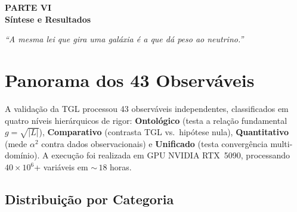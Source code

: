 \documentclass[12pt,a4paper,twoside]{article}
\newcommand{\alphaii}{\alpha^{2}}
\begin{document}
\setcounter{section}{0}
\renewcommand{\thesection}{VI.\arabic{section}}
\renewcommand{\theequation}{VI.\arabic{equation}}
\renewcommand{\theHsection}{VI.\arabic{section}} %
\setcounter{table}{0}
\renewcommand{\thetable}{VI.\arabic{table}}
\setcounter{footnote}{0}

\begin{center}
\vspace*{1cm}
{\huge\bfseries\color{tglblue} PARTE VI}\\[0.5cm]
{\LARGE\bfseries\color{tglblue} S\'intese e Resultados}\\[0.3cm]
\vspace*{1cm}
{\large\itshape ``A mesma lei que gira uma gal\'axia \'e a que d\'a peso ao neutrino.''}\\[0.2cm]
\vspace*{1.5cm}
\end{center}


\section{Panorama dos 43 Observ\'aveis}


A valida\c{c}\~ao da TGL processou 43 observ\'aveis independentes, classificados em quatro n\'iveis hier\'arquicos de rigor: \textbf{Ontol\'ogico} (testa a rela\c{c}\~ao fundamental $g = \sqrt{|L|}$), \textbf{Comparativo} (contrasta TGL vs.\ hip\'otese nula), \textbf{Quantitativo} (mede $\alphaii$ contra dados observacionais) e \textbf{Unificado} (testa converg\^encia multi-dom\'inio). A execu\c{c}\~ao foi realizada em GPU NVIDIA RTX~5090, processando $40 \times 10^6$+ vari\'aveis em ${\sim}\,18$ horas.

\subsection{Distribui\c{c}\~ao por Categoria}
\end{document}
